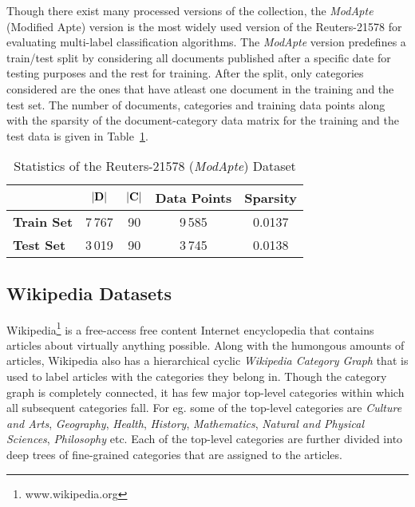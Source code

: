 Though there exist many processed versions of the collection, the \emph{ModApte} (Modified Apte) version is the most widely used version of the Reuters-21578 for evaluating multi-label classification algorithms. The \emph{ModApte} version predefines a train/test split by considering all documents published after a specific date for testing purposes and the rest for training. After the split, only categories considered are the ones that have atleast one document in the training and the test set. The number of documents, categories and training data points along with the sparsity of the document-category data matrix for the training and the test data is given in Table~\ref{reuter:data:stat}.

\begin{table}[h!]
\begin{center}
\begin{tabular}{l c c c c} %
\toprule
& \textbf{$|\mathbf{D}|$} & \textbf{$|\mathbf{C}|$} & \textbf{Data Points} & \textbf{Sparsity}\\
\midrule
\textbf{Train Set}	& 7\,767 & 90 & 9\,585 & 0.0137 \\
\textbf{Test Set}	& 3\,019 & 90 & 3\,745 & 0.0138 \\
\bottomrule         
\end{tabular}
\caption{\label{reuter:data:stat}Statistics of the Reuters-21578 (\emph{ModApte}) Dataset}
\end{center}
\end{table}

\subsection{Wikipedia Datasets}
Wikipedia\footnote{www.wikipedia.org} is a free-access free content Internet encyclopedia that contains articles about virtually anything possible. Along with the humongous amounts of articles, Wikipedia also has a hierarchical cyclic \emph{Wikipedia Category Graph} that is used to label articles with the categories they belong in. 
Though the category graph is completely connected, it has few major top-level categories within which all subsequent categories fall. For eg. some of the top-level categories are \emph{Culture and Arts}, \emph{Geography}, \emph{Health}, \emph{History}, \emph{Mathematics}, \emph{Natural and Physical Sciences}, \emph{Philosophy} etc. Each of the top-level categories are further divided into deep trees of fine-grained categories that are assigned to the articles. 

